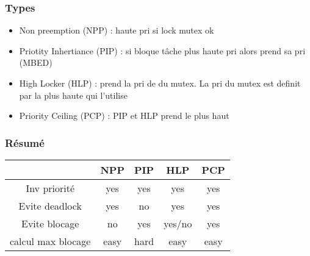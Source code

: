 \documentclass[resume]{subfiles}
\begin{document}
\subsubsection{Types}
\begin{itemize}
\item Non preemption (NPP) : haute pri si lock mutex ok
\item Priotity Inhertiance (PIP) : si bloque tâche plus haute pri alors prend sa pri (MBED)
\item High Locker (HLP) : prend la pri de du mutex. La pri du mutex est definit par la plus haute qui l'utilise
\item Priority Ceiling (PCP) : PIP et HLP prend le plus haut
\end{itemize}

\subsubsection{Résumé}

\begin{table}[H]
\centering
    \begin{tabular}{|c|c|c|c|c|}
    \hline
                       & NPP  & PIP  & HLP    & PCP  \\
    \hline
	Inv priorité       & yes  & yes  & yes    & yes  \\
	\hline
	Evite deadlock     & yes  & no   & yes    & yes  \\
	\hline
	Evite blocage      & no   & yes  & yes/no & yes  \\
	\hline
	calcul max blocage & easy & hard & easy   & easy \\  
    \hline
    \end{tabular}
\end{table}
\end{document}
